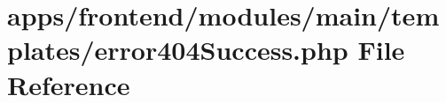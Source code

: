 \hypertarget{frontend_2modules_2main_2templates_2error404_success_8php}{\section{apps/frontend/modules/main/templates/error404\-Success.php File Reference}
\label{frontend_2modules_2main_2templates_2error404_success_8php}
}
